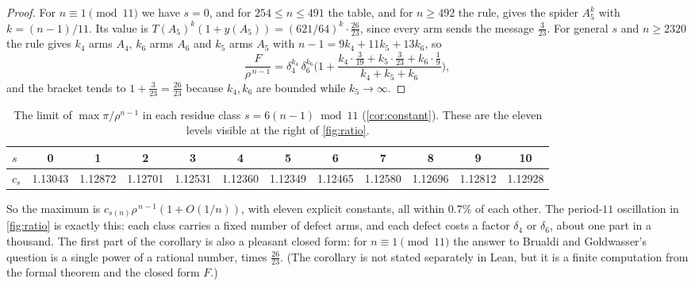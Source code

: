 \documentclass[11pt]{article}
\theoremstyle{definition}
\begin{document}
\begin{proof}
For $n\equiv1\pmod{11}$ we have $s=0$, and for $254\le n\le491$ the table, and for $n\ge492$ the rule,
gives the spider $A_5^{k}$ with $k=(n-1)/11$. Its value is $T(A_5)^k(1+y(A_5))=(621/64)^k\cdot\tfrac{26}{23}$,
since every arm sends the message $\tfrac3{23}$. For general $s$ and $n\ge2320$ the rule gives $k_4$ arms
$A_4$, $k_6$ arms $A_6$ and $k_5$ arms $A_5$ with $n-1=9k_4+11k_5+13k_6$, so
\[
  \frac{F}{\rho^{\,n-1}}=\delta_4^{k_4}\,\delta_6^{k_6}\Big(1+\frac{k_4\cdot\frac3{19}+k_5\cdot\frac3{23}+k_6\cdot\frac19}{k_4+k_5+k_6}\Big),
\]
and the bracket tends to $1+\tfrac3{23}=\tfrac{26}{23}$ because $k_4,k_6$ are bounded while $k_5\to\infty$.
\end{proof}

\begin{table}[h]\centering\footnotesize\setlength{\tabcolsep}{3.2pt}
\begin{tabular}{@{}l*{11}{c}@{}}
\toprule
$s$ & 0 & 1 & 2 & 3 & 4 & 5 & 6 & 7 & 8 & 9 & 10\\
\midrule
$c_s$ & 1.13043 & 1.12872 & 1.12701 & 1.12531 & 1.12360 & 1.12349 & 1.12465 & 1.12580 & 1.12696 & 1.12812 & 1.12928\\
\bottomrule
\end{tabular}
\caption{The limit of $\max\pi/\rho^{n-1}$ in each residue class $s=6(n-1)\bmod11$ (\cref{cor:constant}). These are the
eleven levels visible at the right of \cref{fig:ratio}.}
\label{tab:cs}
\end{table}

So the maximum is $c_{s(n)}\rho^{\,n-1}(1+O(1/n))$, with eleven explicit constants, all within $0.7\%$ of
each other. The period-$11$ oscillation in \cref{fig:ratio} is exactly this: each class carries a fixed
number of defect arms, and each defect costs a factor $\delta_4$ or $\delta_6$, about one part in a
thousand. The first part of the corollary is also a pleasant closed form: for $n\equiv1\pmod{11}$ the
answer to Brualdi and Goldwasser's question is a single power of a rational number, times $\tfrac{26}{23}$.
(The corollary is not stated separately in Lean, but it is a finite computation from the formal
theorem and the closed form $F$.)
\end{document}
